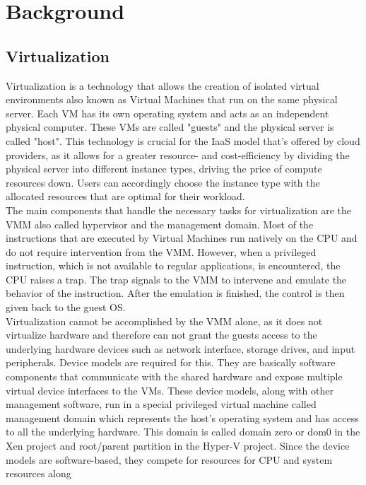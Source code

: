 \chapter{Background}\label{chapter:background}
\section{Virtualization}
Virtualization is a technology that allows the creation of isolated virtual environments also known as 
Virtual Machines that run on the same physical server. Each VM has its own operating system and acts as 
an independent physical computer. These VMs are called "guests" and the physical server is called "host". 
This technology is crucial for the \ac{IaaS} model that's offered by cloud providers, 
as it allows for a greater resource- and cost-efficiency by dividing the physical server into different 
instance types, driving the price of compute resources down. Users can accordingly choose the instance type 
with the allocated resources that are optimal for their workload. \\
The main components that handle the necessary tasks for virtualization are the \ac{VMM} 
also called hypervisor and the management domain. Most of the instructions that are executed by Virtual 
Machines run natively on the CPU and do not require intervention from the \acs{VMM}. However, when a privileged 
instruction, which is not available to regular applications, is encountered, the CPU raises a trap. 
The trap signals to the \acs{VMM} to intervene and emulate the behavior of the instruction.  After the emulation 
is finished, the control is then given back to the guest OS. \\
Virtualization cannot be accomplished by the VMM alone, as it does not virtualize hardware and therefore 
can not grant the guests access to the underlying hardware devices such as network interface, storage drives, 
and input peripherals. Device models are required for this. They are basically software components that 
communicate with the shared hardware and expose multiple virtual device interfaces to the VMs. These 
device models, along with other management software, run in a special privileged virtual machine called 
management domain which represents the host's operating system and has access to all the underlying hardware. 
This domain is called domain zero or dom0 in the Xen project and root/parent partition in the Hyper-V project. 
Since the device models are software-based, they compete for resources for CPU and system resources along 

